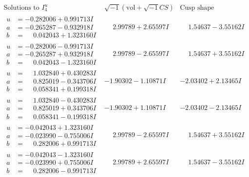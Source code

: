 \documentclass[1p]{elsarticle_modified}
\theoremstyle{definition}
\newcommand{\I}{\sqrt{-1}}
\begin{document}
$$\begin{array}{c|c|c}  
\text{Solutions to }I^u_{4}& \I (\text{vol} + \sqrt{-1}CS) & \text{Cusp shape}\\
 \hline 
\begin{aligned}
u &= -0.282006 + 0.991713 I \\
a &= -0.265287 - 0.932918 I \\
b &= \phantom{-}0.042043 + 1.323160 I\end{aligned}
 & \phantom{-}2.99789 + 2.65597 I & \phantom{-}1.54637 - 3.55162 I \\ \hline\begin{aligned}
u &= -0.282006 - 0.991713 I \\
a &= -0.265287 + 0.932918 I \\
b &= \phantom{-}0.042043 - 1.323160 I\end{aligned}
 & \phantom{-}2.99789 - 2.65597 I & \phantom{-}1.54637 + 3.55162 I \\ \hline\begin{aligned}
u &= \phantom{-}1.032840 + 0.430283 I \\
a &= \phantom{-}0.825019 - 0.343706 I \\
b &= \phantom{-}0.058341 + 0.199318 I\end{aligned}
 & -1.90302 - 1.10871 I & -2.03402 + 2.13465 I \\ \hline\begin{aligned}
u &= \phantom{-}1.032840 - 0.430283 I \\
a &= \phantom{-}0.825019 + 0.343706 I \\
b &= \phantom{-}0.058341 - 0.199318 I\end{aligned}
 & -1.90302 + 1.10871 I & -2.03402 - 2.13465 I \\ \hline\begin{aligned}
u &= -0.042043 + 1.323160 I \\
a &= -0.023990 - 0.755006 I \\
b &= \phantom{-}0.282006 + 0.991713 I\end{aligned}
 & \phantom{-}2.99789 - 2.65597 I & \phantom{-}1.54637 + 3.55162 I \\ \hline\begin{aligned}
u &= -0.042043 - 1.323160 I \\
a &= -0.023990 + 0.755006 I \\
b &= \phantom{-}0.282006 - 0.991713 I\end{aligned}
 & \phantom{-}2.99789 + 2.65597 I & \phantom{-}1.54637 - 3.55162 I \\ \hline\begin{aligned}

\end{aligned}
\end{array}$$
\end{document}
